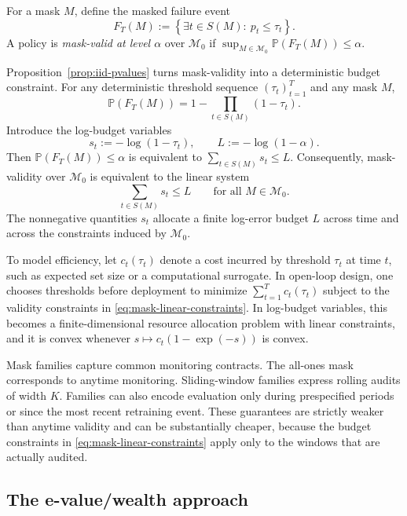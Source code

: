 \documentclass{uai2026} %
\newcommand{\1}{\mathbf{1}}
\newcommand{\prob}{\mathbb{P}}
\newcommand{\mcal}{\mathcal{M}}
\begin{document}
For a mask $M$, define the masked failure event
\begin{equation*}
  F_T(M):=\left\{\exists t\in S(M):\ p_t\le\tau_t\right\}.
\end{equation*}
A policy is \emph{mask-valid at level $\alpha$} over $\mcal_0$ if $\sup_{M\in\mcal_0}\prob(F_T(M))\le\alpha$.

Proposition~\ref{prop:iid-pvalues} turns mask-validity into a deterministic budget constraint.
For any deterministic threshold sequence $(\tau_t)_{t=1}^T$ and any mask $M$,
\begin{equation}
  \label{eq:mask-failure-product}
  \prob(F_T(M))=1-\prod_{t\in S(M)}(1-\tau_t).
\end{equation}
Introduce the log-budget variables
\begin{equation*}
  s_t:=-\log(1-\tau_t),\qquad L:=-\log(1-\alpha).
\end{equation*}
Then $\prob(F_T(M))\le\alpha$ is equivalent to $\sum_{t\in S(M)} s_t\le L$.
Consequently, mask-validity over $\mcal_0$ is equivalent to the linear system
\begin{equation}
  \label{eq:mask-linear-constraints}
  \sum_{t\in S(M)} s_t\le L\qquad\text{for all }M\in\mcal_0.
\end{equation}
The nonnegative quantities $s_t$ allocate a finite log-error budget $L$ across time and across the constraints induced by $\mcal_0$.

To model efficiency, let $c_t(\tau_t)$ denote a cost incurred by threshold $\tau_t$ at time $t$, such as expected set size or a computational surrogate.
In open-loop design, one chooses thresholds before deployment to minimize $\sum_{t=1}^{T} c_t(\tau_t)$ subject to the validity constraints in \eqref{eq:mask-linear-constraints}.
In log-budget variables, this becomes a finite-dimensional resource allocation problem with linear constraints, and it is convex whenever $s\mapsto c_t(1-\exp(-s))$ is convex.

Mask families capture common monitoring contracts.
The all-ones mask corresponds to anytime monitoring.
Sliding-window families express rolling audits of width $K$.
Families can also encode evaluation only during prespecified periods or since the most recent retraining event.
These guarantees are strictly weaker than anytime validity and can be substantially cheaper, because the budget constraints in \eqref{eq:mask-linear-constraints} apply only to the windows that are actually audited.

\subsection{The e-value/wealth approach}
\label{sec:wealth}
\end{document}
